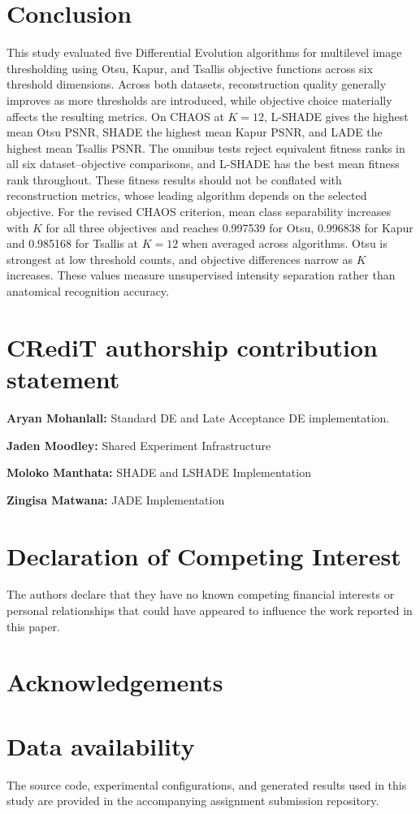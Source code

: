 \documentclass[review,authoryear]{elsarticle}
\begin{document}


\section{Conclusion}
\label{sec:conclusion}

This study evaluated five Differential Evolution algorithms for
multilevel image thresholding using Otsu, Kapur, and Tsallis objective
functions across six threshold dimensions.
Across both datasets, reconstruction quality generally improves as more
thresholds are introduced, while objective choice materially affects
the resulting metrics. On CHAOS at $K=12$, L-SHADE gives the highest
mean Otsu PSNR, SHADE the highest mean Kapur PSNR, and LADE the highest
mean Tsallis PSNR. The omnibus tests reject equivalent fitness ranks in
all six dataset--objective comparisons, and L-SHADE has the best mean
fitness rank throughout. These fitness results should not be conflated
with reconstruction metrics, whose leading algorithm depends on the
selected objective.
For the revised CHAOS criterion, mean class separability increases with $K$
for all three objectives and reaches 0.997539 for Otsu, 0.996838 for Kapur and
0.985168 for Tsallis at $K=12$ when averaged across algorithms. Otsu is
strongest at low threshold counts, and objective differences narrow as $K$
increases. These values measure unsupervised intensity separation rather than
anatomical recognition accuracy.




\section*{CRediT authorship contribution statement}

\textbf{Aryan Mohanlall:}
Standard DE and Late Acceptance DE implementation.

\textbf{Jaden Moodley:}
Shared Experiment Infrastructure

\textbf{Moloko Manthata:}
SHADE and LSHADE Implementation

\textbf{Zingisa Matwana:}
JADE Implementation





\section*{Declaration of Competing Interest}

The authors declare that they have no known competing financial
interests or personal relationships that could have appeared to
influence the work reported in this paper.


\section*{Acknowledgements}



\section*{Data availability}

The source code, experimental configurations, and generated results
used in this study are provided in the accompanying assignment
submission repository.




 


\end{document}
